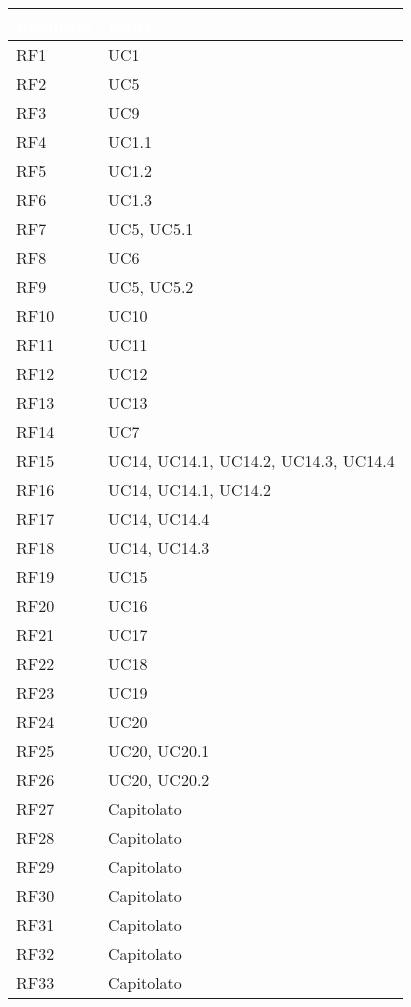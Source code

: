 {
      \setlength{\freewidth}{\dimexpr\textwidth-0\tabcolsep}
      \renewcommand{\arraystretch}{1.5}
      \centering
      \setlength{\aboverulesep}{0pt}
      \setlength{\belowrulesep}{0pt}
      \begin{longtable}{C{.47\freewidth} C{.47\freewidth}}
         \toprule
      \textcolor{white}{\textbf{Requisito}}&
      \textcolor{white}{\textbf{Fonti}}\\
      \toprule
      \endhead
      
      RF1 & UC1\\
      RF2 & UC5\\
      RF3 & UC9\\
      RF4 & UC1.1\\
      RF5 & UC1.2\\
      RF6 & UC1.3\\
      RF7 & UC5, UC5.1\\
      RF8 & UC6\\
      RF9 & UC5, UC5.2\\
      RF10 & UC10\\
      RF11 & UC11\\
      RF12 & UC12\\
      RF13 & UC13\\
      RF14 & UC7\\
      RF15 & UC14, UC14.1, UC14.2, UC14.3, UC14.4\\
      RF16 & UC14, UC14.1, UC14.2\\
      RF17 & UC14, UC14.4\\
      RF18 & UC14, UC14.3\\
      RF19 & UC15\\
      RF20 & UC16\\
      RF21 & UC17\\
      RF22 & UC18\\
      RF23 & UC19\\
      RF24 & UC20\\
      RF25 & UC20, UC20.1\\
      RF26 & UC20, UC20.2\\
      RF27 & Capitolato\\
      RF28 & Capitolato\\
      RF29 & Capitolato\\
      RF30 & Capitolato\\
      RF31 & Capitolato\\
      RF32 & Capitolato\\
      RF33 & Capitolato\\


\end{longtable}}
